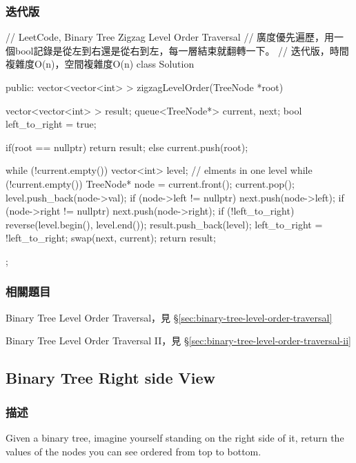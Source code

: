 \subsubsection{迭代版}
\begin{Code}
// LeetCode, Binary Tree Zigzag Level Order Traversal
// 廣度優先遍歷，用一個bool記錄是從左到右還是從右到左，每一層結束就翻轉一下。
// 迭代版，時間複雜度O(n)，空間複雜度O(n)
class Solution {
public:
    vector<vector<int> > zigzagLevelOrder(TreeNode *root) {
        vector<vector<int> > result;
        queue<TreeNode*> current, next;
        bool left_to_right = true;
        
        if(root == nullptr) {
            return result;
        } else {
            current.push(root);
        }

        while (!current.empty()) {
            vector<int> level; // elments in one level
            while (!current.empty()) {
                TreeNode* node = current.front();
                current.pop();
                level.push_back(node->val);
                if (node->left != nullptr) next.push(node->left);
                if (node->right != nullptr) next.push(node->right);
            }
            if (!left_to_right) reverse(level.begin(), level.end());
            result.push_back(level);
            left_to_right = !left_to_right;
            swap(next, current);
        }
        return result;
    }
};
\end{Code}


\subsubsection{相關題目}
\begindot
\item Binary Tree Level Order Traversal，見 \S \ref{sec:binary-tree-level-order-traversal}
\item Binary Tree Level Order Traversal II，見 \S \ref{sec:binary-tree-level-order-traversal-ii}
\myenddot

\subsection{Binary Tree Right side View}
\label{sec:binary-tree-right-side-view}


\subsubsection{描述}
Given a binary tree, imagine yourself standing on the right side of it, return the values of the nodes you can see ordered from top to bottom.


